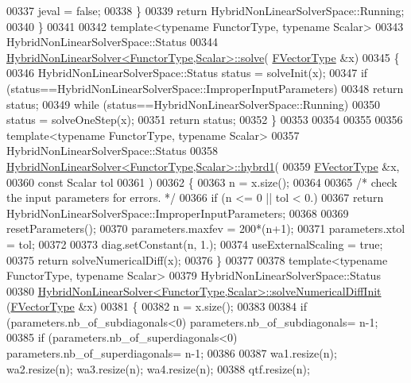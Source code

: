 \begin{DoxyCode}
00337         jeval = \textcolor{keyword}{false};
00338     \}
00339     \textcolor{keywordflow}{return} HybridNonLinearSolverSpace::Running;
00340 \}
00341 
00342 \textcolor{keyword}{template}<\textcolor{keyword}{typename} FunctorType, \textcolor{keyword}{typename} Scalar>
00343 HybridNonLinearSolverSpace::Status
00344 \hyperlink{class_eigen_1_1_hybrid_non_linear_solver}{HybridNonLinearSolver<FunctorType,Scalar>::solve}(
      \hyperlink{group___core___module}{FVectorType}  &x)
00345 \{
00346     HybridNonLinearSolverSpace::Status status = solveInit(x);
00347     \textcolor{keywordflow}{if} (status==HybridNonLinearSolverSpace::ImproperInputParameters)
00348         \textcolor{keywordflow}{return} status;
00349     \textcolor{keywordflow}{while} (status==HybridNonLinearSolverSpace::Running)
00350         status = solveOneStep(x);
00351     \textcolor{keywordflow}{return} status;
00352 \}
00353 
00354 
00355 
00356 \textcolor{keyword}{template}<\textcolor{keyword}{typename} FunctorType, \textcolor{keyword}{typename} Scalar>
00357 HybridNonLinearSolverSpace::Status
00358 \hyperlink{class_eigen_1_1_hybrid_non_linear_solver}{HybridNonLinearSolver<FunctorType,Scalar>::hybrd1}(
00359         \hyperlink{group___core___module}{FVectorType}  &x,
00360         \textcolor{keyword}{const} Scalar tol
00361         )
00362 \{
00363     n = x.size();
00364 
00365     \textcolor{comment}{/* check the input parameters for errors. */}
00366     \textcolor{keywordflow}{if} (n <= 0 || tol < 0.)
00367         \textcolor{keywordflow}{return} HybridNonLinearSolverSpace::ImproperInputParameters;
00368 
00369     resetParameters();
00370     parameters.maxfev = 200*(n+1);
00371     parameters.xtol = tol;
00372 
00373     diag.setConstant(n, 1.);
00374     useExternalScaling = \textcolor{keyword}{true};
00375     \textcolor{keywordflow}{return} solveNumericalDiff(x);
00376 \}
00377 
00378 \textcolor{keyword}{template}<\textcolor{keyword}{typename} FunctorType, \textcolor{keyword}{typename} Scalar>
00379 HybridNonLinearSolverSpace::Status
00380 \hyperlink{class_eigen_1_1_hybrid_non_linear_solver}{HybridNonLinearSolver<FunctorType,Scalar>::solveNumericalDiffInit}
      (\hyperlink{group___core___module}{FVectorType}  &x)
00381 \{
00382     n = x.size();
00383 
00384     \textcolor{keywordflow}{if} (parameters.nb\_of\_subdiagonals<0) parameters.nb\_of\_subdiagonals= n-1;
00385     \textcolor{keywordflow}{if} (parameters.nb\_of\_superdiagonals<0) parameters.nb\_of\_superdiagonals= n-1;
00386 
00387     wa1.resize(n); wa2.resize(n); wa3.resize(n); wa4.resize(n);
00388     qtf.resize(n);

\end{DoxyCode}
